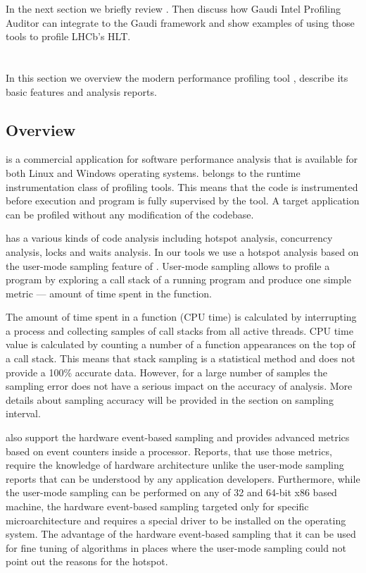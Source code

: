 \documentclass[a4paper]{jpconf}
\begin{document}
In the next section we briefly review \iamp. Then discuss how Gaudi Intel Profiling Auditor can integrate \amp to 
the Gaudi framework and show examples of using those tools to profile LHCb's HLT.

\section{\iamp}
In this section we overview the modern performance profiling tool \iamp, describe its basic features and analysis 
reports.

\subsection{Overview}
\iamp is a commercial application for software performance analysis that is available for both Linux and Windows 
operating systems. \amp belongs to the runtime instrumentation class of profiling tools. This means that the code is 
instrumented before execution and program is fully supervised by the tool. A target application can be profiled without 
any modification of the codebase.

\iamp has a various kinds of code analysis including hotspot analysis, concurrency analysis, locks and waits analysis. 
In our tools we use a hotspot analysis based on the user-mode  sampling feature of \amp. User-mode sampling allows 
to profile a program by exploring a call stack of a running program and produce one simple metric --- amount of time 
spent in the function. 

The amount of time spent in a function (CPU time) is calculated by interrupting a process and collecting samples of 
call stacks from all active threads. CPU time value is calculated by counting a number of  a function appearances on 
the top of a call stack. This means that stack sampling is a statistical method and does not provide a 100\% accurate 
data. However, for a large number of samples the sampling error does not have a serious impact on the accuracy of 
analysis. More details about sampling accuracy will be provided in the section on sampling interval.

\amp also support the hardware event-based sampling and provides advanced metrics based on event counters inside 
a processor. Reports, that use those metrics,  require the knowledge of hardware architecture  unlike the user-mode 
sampling reports that can be understood by any application developers. Furthermore, while the user-mode sampling can 
be performed on any of 32 and 64-bit x86 based machine, the hardware event-based sampling targeted only for specific 
\intel microarchitecture and requires a special driver to be installed on the operating system. The advantage of 
the hardware event-based sampling that it can be used for fine tuning of algorithms in places where  the user-mode 
sampling could not point out the reasons for the hotspot.
\end{document}
